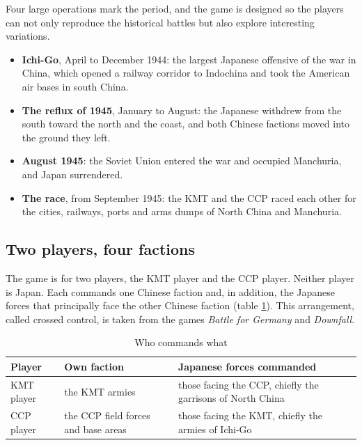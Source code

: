 \documentclass[11pt]{article}
\begin{document}
Four large operations mark the period, and the game is designed so the players can not only reproduce the historical battles
but also explore interesting variations.
\begin{itemize}
\item \textbf{Ichi-Go}, April to December 1944: the largest Japanese offensive of the war in China, which opened a railway corridor to Indochina and took the American air bases in south China.
\item \textbf{The reflux of 1945}, January to August: the Japanese withdrew from the south toward the north and the coast, and both Chinese factions moved into the ground they left.
\item \textbf{August 1945}: the Soviet Union entered the war and occupied Manchuria, and Japan surrendered.
\item \textbf{The race}, from September 1945: the KMT and the CCP raced each other for the cities, railways, ports and arms dumps of North China and Manchuria.
\end{itemize}

\subsection*{Two players, four factions}
The game is for two players, the KMT player and the CCP player. Neither player is Japan. Each commands one Chinese faction and, in addition, the Japanese forces that principally face the other Chinese faction (table \ref{tab:intro-control}). This arrangement, called crossed control, is taken from the games \emph{Battle for Germany} and \emph{Downfall}.

\begin{table}[ht]
\centering\small
\begin{tabular}{@{}lll@{}}
\toprule
Player & Own faction & Japanese forces commanded \\
\midrule
KMT player & the KMT armies & those facing the CCP, chiefly the garrisons of North China \\
CCP player & the CCP field forces and base areas & those facing the KMT, chiefly the armies of Ichi-Go \\
\bottomrule
\end{tabular}
\caption{Who commands what}\label{tab:intro-control}
\end{table}
\end{document}
